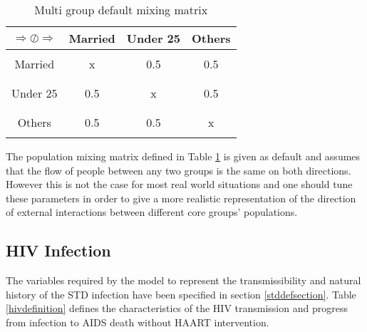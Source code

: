 \begin{landscape}
\begin{longtable}[c]{|c|c|c|c|}
\caption{Multi group default mixing matrix}\\ \hline
\label{multimixmat}
$\Rightarrow \oslash \Rightarrow $ & Married & Under 25 & Others \\\hline
& & & \\
Married  & x       & 0.5      & 0.5    \\
& & & \\\hline
& & & \\
Under 25 & 0.5     & x        & 0.5    \\
& & & \\\hline
& & & \\
Others   & 0.5     & 0.5      & x      \\
& & & \\\hline
\end{longtable}

\end{landscape}

The population mixing matrix defined in Table \ref{multimixmat} is given as default and
assumes that the flow of people between any two groups is the same on both directions.
However this is not the case for most real world situations and one should tune these
parameters in order to give a more realistic representation of the direction of external
interactions between different core groups' populations.

\subsection{HIV Infection}

The variables required by the model to represent the transmissibility and natural history
of the STD infection have been specified in section \ref{stddefsection}. Table
\ref{hivdefinition} defines the characteristics of the HIV transmission and progress from
infection to AIDS death without HAART intervention.

